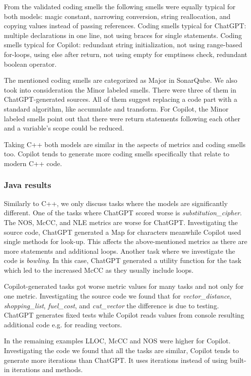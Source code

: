 From the validated coding smells the following smells were equally typical for both models: magic constant, narrowing conversion, string reallocation, and copying values instead of passing references.
Coding smells typical for ChatGPT: multiple declarations in one line, not using braces for single statements.
Coding smells typical for Copilot: redundant string initialization, not using range-based for-loops, using else after return, not using empty for emptiness check, redundant boolean operator.

The mentioned coding smells are categorized as Major in SonarQube.
We also took into consideration the Minor labeled smells.
There were three of them in ChatGPT-generated sources.
All of them suggest replacing a code part with a standard algorithm, like accumulate and transform.
For Copilot, the Minor labeled smells point out that there were return statements following each other and a variable's scope could be reduced.

Taking C++ both models are similar in the aspects of metrics and coding smells too.
Copilot tends to generate more coding smells specifically that relate to modern C++ code.

\subsubsection{Java results}

Similarly to C++, we only discuss tasks where the models are significantly different.
One of the tasks where ChatGPT scored worse is \textit{substitution\_cipher}.
The NOS, McCC, and NLE metrics are worse for ChatGPT.
Investigating the source code, ChatGPT generated a Map for characters meanwhile Copilot used single methods for look-up.
This affects the above-mentioned metrics as there are more statements and additional loops.
Another task where we investigate the code is \textit{bowling}.
In this case, ChatGPT generated a utility function for the task which led to the increased McCC as they usually include loops.

Copilot-generated tasks got worse metric values for many tasks and not only for one metric.
Investigating the source code we found that for \textit{vector\_distance}, \textit{shopping\_list}, \textit{fuel\_cost}, and \textit{cut\_vector} the difference is due to testing.
ChatGPT generates fixed tests while Copilot reads values from console resulting additional code e.g. for reading vectors.

In the remaining examples LLOC, McCC and NOS were higher for Copilot.
Investigating the code we found that all the tasks are similar, Copilot tends to generate more iterations than ChatGPT.
It uses iterations instead of using built-in iterations and methods.

